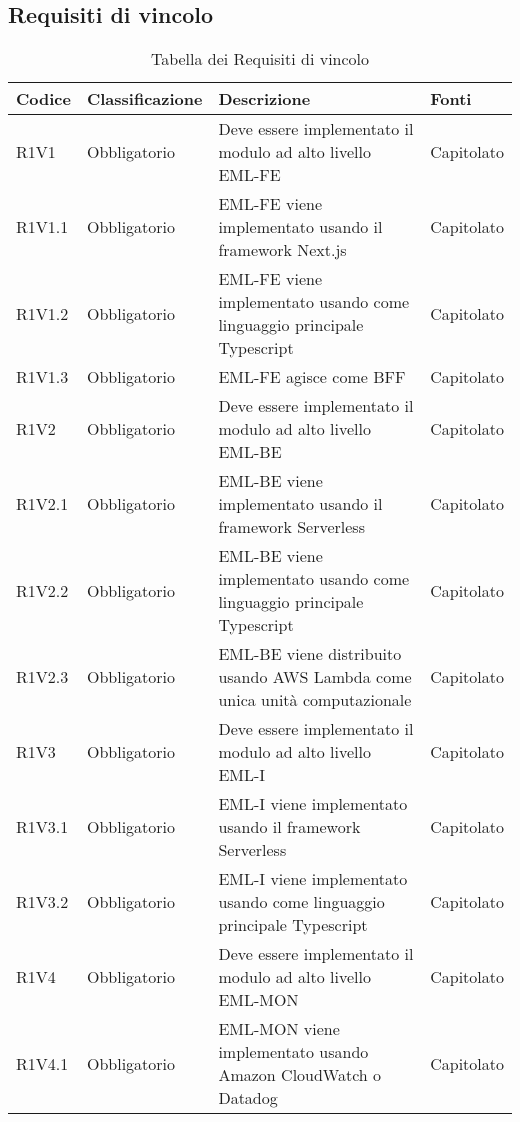 \subsection{Requisiti di vincolo}

{


\centering
\renewcommand{\arraystretch}{2}
\begin{longtable}{C{2.5cm} C{2.8cm} C{6.7cm} C{2.5cm}}
\caption{Tabella dei Requisiti di vincolo}\\
\textbf{Codice} &
\textbf{Classificazione}&
\textbf{Descrizione}&
\textbf{Fonti}\\
\endhead


R1V1 & Obbligatorio & Deve essere implementato il modulo ad alto livello EML-FE & Capitolato \\
R1V1.1 & Obbligatorio & EML-FE viene implementato usando il framework Next.js & Capitolato \\
R1V1.2 & Obbligatorio & EML-FE viene implementato usando come linguaggio principale Typescript & Capitolato \\
R1V1.3 & Obbligatorio & EML-FE agisce come BFF & Capitolato \\


R1V2 & Obbligatorio & Deve essere implementato il modulo ad alto livello EML-BE & Capitolato \\
R1V2.1 & Obbligatorio & EML-BE viene implementato usando il framework Serverless & Capitolato \\
R1V2.2 & Obbligatorio & EML-BE viene implementato usando come linguaggio principale Typescript & Capitolato \\
R1V2.3 & Obbligatorio & EML-BE viene distribuito usando AWS Lambda come unica unità computazionale & Capitolato \\


R1V3 & Obbligatorio & Deve essere implementato il modulo ad alto livello EML-I & Capitolato \\
R1V3.1 & Obbligatorio & EML-I viene implementato usando il framework Serverless & Capitolato \\
R1V3.2 & Obbligatorio & EML-I viene implementato usando come linguaggio principale Typescript & Capitolato \\

R1V4 & Obbligatorio & Deve essere implementato il modulo ad alto livello EML-MON & Capitolato \\
R1V4.1 & Obbligatorio & EML-MON viene implementato usando Amazon CloudWatch o  Datadog & Capitolato \\


\end{longtable}}
